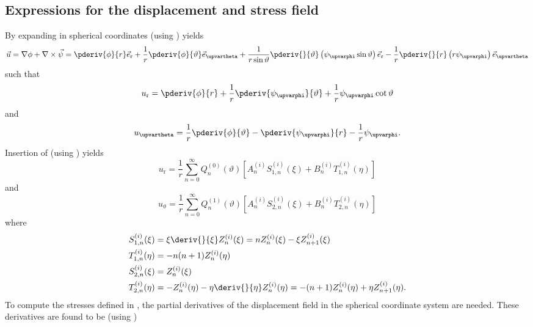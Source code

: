 \subsection{Expressions for the displacement and stress field}
By expanding  in spherical coordinates (using ) yields
\begin{equation}
	\vec{u} = \nabla\phi + \nabla\times\vec{\psi} = \pderiv{\phi}{r}\vec{e}_{\mathrm{r}} + \frac{1}{r}\pderiv{\phi}{\vartheta}\vec{e}_{\upvartheta} + \frac{1}{r\sin\vartheta}\pderiv{}{\vartheta}\left(\psi_\upvarphi\sin\vartheta\right)\vec{e}_{\mathrm{r}} - \frac{1}{r}\pderiv{}{r}\left(r\psi_\upvarphi\right)\vec{e}_{\upvartheta} 
\end{equation}
such that
\begin{equation}
	u_{\mathrm{r}} = \pderiv{\phi}{r} + \frac{1}{r}\pderiv{\psi_\upvarphi}{\vartheta} + \frac{1}{r}\psi_\upvarphi\cot\vartheta
\end{equation}
and
\begin{equation}
	u_\upvartheta = \frac{1}{r}\pderiv{\phi}{\vartheta} -\pderiv{\psi_\upvarphi}{r} -\frac{1}{r}\psi_\upvarphi.
\end{equation}
Insertion of  (using )
yields
\begin{equation}\label{Eq1:u_rgen}
	u_{\mathrm{r}} = \frac{1}{r}\sum_{n=0}^\infty Q_n^{(0)}(\vartheta)\left[A_n^{(i)}S_{1,n}^{(i)}(\xi)+B_n^{(i)}T_{1,n}^{(i)}(\eta)\right]
\end{equation}
and
\begin{equation}\label{Eq1:u_tgen}
	u_\upvartheta = \frac{1}{r}\sum_{n=0}^\infty Q_n^{(1)}(\vartheta)\left[A_n^{(i)}S_{2,n}^{(i)}(\xi)+B_n^{(i)}T_{2,n}^{(i)}(\eta)\right]
\end{equation}
where
\begin{align*}
	S_{1,n}^{(i)}(\xi) &= \xi \deriv{}{\xi}Z_n^{(i)}(\xi) =  nZ_n^{(i)}(\xi)-\xi Z_{n+1}^{(i)}(\xi)\\ 
	T_{1,n}^{(i)}(\eta) &= -n(n+1)Z_n^{(i)}(\eta)\\
	S_{2,n}^{(i)}(\xi) &= Z_n^{(i)}(\xi)\\
	T_{2,n}^{(i)}(\eta) &= -Z_n^{(i)}(\eta)-\eta \deriv{}{\eta}Z_n^{(i)}(\eta) = -(n+1)Z_n^{(i)}(\eta) + \eta Z_{n+1}^{(i)}(\eta).
\end{align*}
To compute the stresses defined in , the partial derivatives of the displacement field in the spherical coordinate system are needed. These derivatives are found to be (using )
